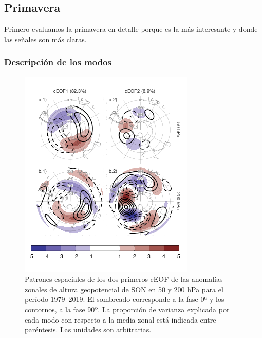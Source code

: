 \documentclass[12pt,oneside]{reedthesis}
\begin{document}
\hypertarget{primavera}{%
\subsection{Primavera}\label{primavera}}

Primero evaluamos la primavera en detalle porque es la más interesante y donde las señales son más claras.

\hypertarget{descripciuxf3n-de-los-modos}{%
\subsubsection{Descripción de los modos}\label{descripciuxf3n-de-los-modos}}






\begin{figure}
\includegraphics{figures/20-ceofs/ceofs-1-1} \caption{Patrones espaciales de los dos primeros cEOF de las anomalías zonales de altura geopotencial de SON en 50 y 200 hPa para el período 1979--2019.
El sombreado corresponde a la fase 0º y los contornos, a la fase 90º.
La proporción de varianza explicada por cada modo con respecto a la media zonal está indicada entre paréntesis.
Las unidades son arbitrarias.}\label{fig:ceofs-1}
\end{figure}
\end{document}
